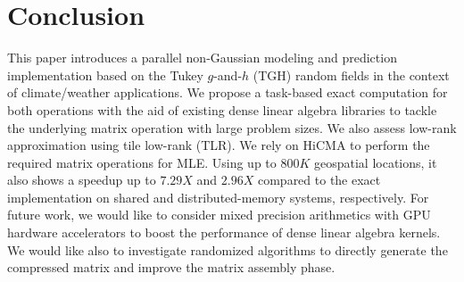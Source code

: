 \documentclass[conference]{IEEEtran}
\begin{document}
\section{Conclusion}
This paper introduces a parallel non-Gaussian modeling and
prediction implementation based on the Tukey $g$-and-$h$ (TGH)
random fields in the context of climate/weather applications. 
We propose a task-based exact computation for both operations
with the aid of existing dense linear algebra libraries to tackle the underlying matrix operation with large problem sizes. We also
assess low-rank approximation using tile low-rank (TLR). We rely on HiCMA to perform the required
matrix operations for MLE. Using up to $800K$ geospatial locations, it also shows a speedup up to 
$7.29X$ and $2.96X$ compared to the exact implementation on shared and distributed-memory systems,
respectively. For future work, we would like to consider mixed precision arithmetics with GPU
hardware accelerators to boost the performance of dense linear algebra kernels. We would like 
also to investigate randomized algorithms to directly generate the compressed matrix and improve
the matrix assembly phase.






\end{document}
